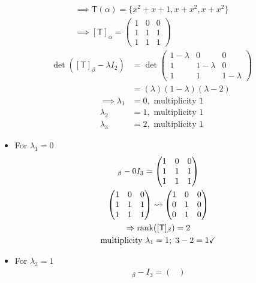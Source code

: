 \begin{enumerate}
\begin{gather}
\implies \mathsf{T}(\alpha) = \{x^2+x+1,x+x^2,x+x^2 \}\\
\implies [\mathsf{T}]_\alpha = \begin{pmatrix}
1 & 0 & 0\\
1 & 1 & 1 \\
1 & 1 & 1
\end{pmatrix}
\end{gather}
\begin{align}
\det{([\mathsf{T}]_\beta -\lambda I_2)} &= \det{\begin{pmatrix}
1-\lambda & 0 & 0\\
1 & 1-\lambda & 0\\
1 & 1 & 1-\lambda
  \end{pmatrix}}\\
&= (\lambda)(1-\lambda)(\lambda - 2)
\end{align}
\begin{align}
\implies \lambda_1 &= 0, \text{ multiplicity } 1\\
\lambda_2 &= 1, \text{ multiplicity } 1\\
\lambda_3 &= 2, \text{ multiplicity } 1
\end{align}
\begin{itemize}
\item For $\lambda_1 = 0$
\begin{gather}
[\mathsf{T}]_\beta -0 I_3= \begin{pmatrix}
1 & 0 & 0\\
1 & 1 & 1\\
1 & 1 & 1
\end{pmatrix}\\
\begin{pmatrix}
1 & 0 & 0\\
1 & 1 & 1\\
1 & 1 & 1
\end{pmatrix}\leadsto
\begin{pmatrix}
1 & 0 & 0\\
0 & 1 & 0\\
0 & 1 & 0
\end{pmatrix}\\
\implies \rank{[\mathsf{T}]_\beta} = 2\\
\text{multiplicity } \lambda_1 =1; \; 3-2 =1 \checkmark
\end{gather}
\item For $\lambda_2 = 1$
\begin{gather}
[\mathsf{T}]_\beta - I_3 = \begin{pmatrix}

\end{pmatrix}
\end{gather}
\end{itemize}
\end{enumerate}

